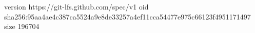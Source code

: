 version https://git-lfs.github.com/spec/v1
oid sha256:95aa4ae4c387ca5524a9e8de33257a4ef11cca54477e975c66123f4951171497
size 196704
